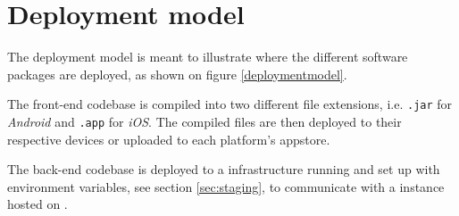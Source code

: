\section{Deployment model}
The deployment model is meant to illustrate where the different software packages are deployed, as shown on figure \ref{deploymentmodel}.

The front-end codebase is compiled into two different file extensions, i.e. \verb+.jar+ for \textit{Android} and \verb+.app+ for \textit{iOS}. 
The compiled files are then deployed to their respective devices or uploaded to each platform's \gls{appstore}.

The back-end codebase is deployed to a  infrastructure running  and set up with environment variables, see section \ref{sec:staging}, to communicate with a  instance hosted on .

